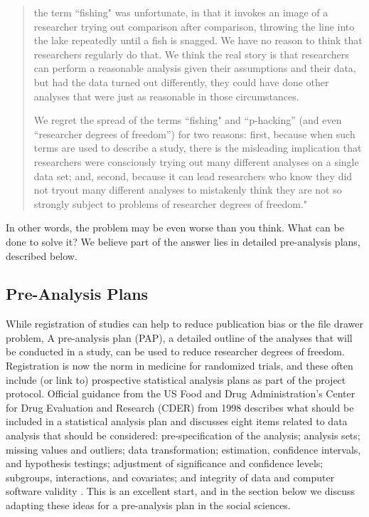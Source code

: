 \documentclass[12pt] {article}
\begin{document}
\begin{quote}
the term ``fishing" was unfortunate, in that it invokes an image of a
researcher trying out comparison after comparison, throwing the line
into the lake repeatedly until a fish is snagged. We have no reason to
think that researchers regularly do that. We think the real story is
that researchers can perform a reasonable analysis given their
assumptions and their data, but had the data turned out differently,
they could have done other analyses that were just as reasonable in
those circumstances.

We regret the spread of the terms ``fishing" and ``p-hacking'' (and even
``researcher degrees of freedom'') for two reasons: first, because when
such terms are used to describe a study, there is the misleading
implication that researchers were consciously trying out many different
analyses on a single data set; and, second, because it can lead
researchers who know they did not tryout many different analyses to
mistakenly think they are not so strongly subject to problems of
researcher degrees of freedom."
\end{quote}

In other words, the problem may be even worse than you think. What can be
done to solve it? We believe part of the answer lies in detailed
pre-analysis plans, described below.

\subsection{Pre-Analysis
Plans}\label{pre-analysis-plans}

While registration of studies can help to reduce publication bias or the file drawer problem, 
A pre-analysis plan (PAP), a detailed outline of the analyses that will be conducted in a study, can be used to reduce researcher degrees of freedom. Registration is now the norm in medicine for randomized trials, and these often include (or link to) prospective statistical analysis plans as part of the project protocol. Official guidance from the US Food and Drug Administration's Center for Drug Evaluation and Research (CDER) from 1998 describes what should be included in a statistical analysis plan and discusses eight items related to data analysis that should be considered: pre-specification of the analysis; analysis sets; missing values and outliers; data transformation; estimation, confidence intervals, and hypothesis testings; adjustment of significance and confidence levels; subgroups, interactions, and covariates; and integrity of data and computer software validity \citep{food1998guidance}.   %
This is an excellent start, and in the section below we discuss adapting these ideas for a pre-analysis plan in the social sciences.
\end{document}
